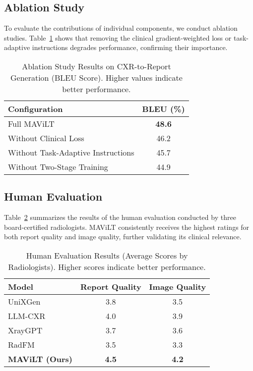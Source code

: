 \subsection{Ablation Study}

To evaluate the contributions of individual components, we conduct ablation studies. Table~\ref{tab:ablation} shows that removing the clinical gradient-weighted loss or task-adaptive instructions degrades performance, confirming their importance.

\begin{table}[ht]
    \centering
    \caption{Ablation Study Results on CXR-to-Report Generation (BLEU Score). Higher values indicate better performance.}
    \label{tab:ablation}
    \begin{tabular}{lc}
        \toprule
        \textbf{Configuration} & \textbf{BLEU (\%)} \\
        \midrule
        Full MAViLT          & \textbf{48.6} \\
        Without Clinical Loss & 46.2 \\
        Without Task-Adaptive Instructions & 45.7 \\
        Without Two-Stage Training & 44.9 \\
        \bottomrule
    \end{tabular}
\end{table}

\subsection{Human Evaluation}

Table~\ref{tab:human-eval} summarizes the results of the human evaluation conducted by three board-certified radiologists. MAViLT consistently receives the highest ratings for both report quality and image quality, further validating its clinical relevance.

\begin{table}[ht]
    \centering
    \caption{Human Evaluation Results (Average Scores by Radiologists). Higher scores indicate better performance.}
    \label{tab:human-eval}
    \begin{tabular}{lcc}
        \toprule
        \textbf{Model} & \textbf{Report Quality} & \textbf{Image Quality} \\
        \midrule
        UniXGen       & 3.8 & 3.5 \\
        LLM-CXR       & 4.0 & 3.9 \\
        XrayGPT       & 3.7 & 3.6 \\
        RadFM         & 3.5 & 3.3 \\
        \textbf{MAViLT (Ours)} & \textbf{4.5} & \textbf{4.2} \\
        \bottomrule
    \end{tabular}
\end{table}

